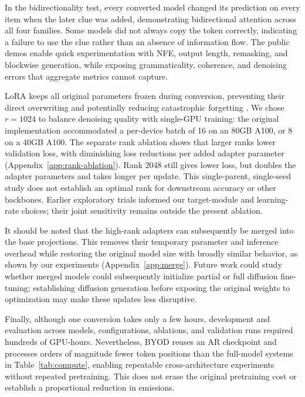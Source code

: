 \documentclass{article}
\begin{document}
In the bidirectionality test, every converted model changed its prediction on every item when the later clue was added, demonstrating bidirectional attention across all four families. Some models did not always copy the token correctly, indicating a failure to use the clue rather than an absence of information flow. The public demos enable quick experimentation with NFE, output length, remasking, and blockwise generation, while exposing grammaticality, coherence, and denoising errors that aggregate metrics cannot capture.

LoRA keeps all original parameters frozen during conversion, preventing their direct overwriting and potentially reducing catastrophic forgetting \citep{luo2023catastrophic}. We chose \(r=1024\) to balance denoising quality with single-GPU training: the original implementation accommodated a per-device batch of 16 on an 80GB A100, or 8 on a 40GB A100. The separate rank ablation shows that larger ranks lower validation loss, with diminishing loss reductions per added adapter parameter (Appendix~\ref{app:rank-ablation}). Rank 2048 still gives lower loss, but doubles the adapter parameters and takes longer per update. This single-parent, single-seed study does not establish an optimal rank for downstream accuracy or other backbones. Earlier exploratory trials informed our target-module and learning-rate choices; their joint sensitivity remains outside the present ablation.

It should be noted that the high-rank adapters can subsequently be merged into the base projections. This removes their temporary parameter and inference overhead while restoring the original model size with broadly similar behavior, as shown by our experiments (Appendix~\ref{app:merge}). Future work could study whether merged models could subsequently initialize partial or full diffusion fine-tuning; establishing diffusion generation before exposing the original weights to optimization may make these updates less disruptive.

Finally, although one conversion takes only a few hours, development and evaluation across models, configurations, ablations, and validation runs required hundreds of GPU-hours. Nevertheless, BYOD reuses an AR checkpoint and processes orders of magnitude fewer token positions than the full-model systems in Table~\ref{tab:compute}, enabling repeatable cross-architecture experiments without repeated pretraining. This does not erase the original pretraining cost or establish a proportional reduction in emissions.
\end{document}
